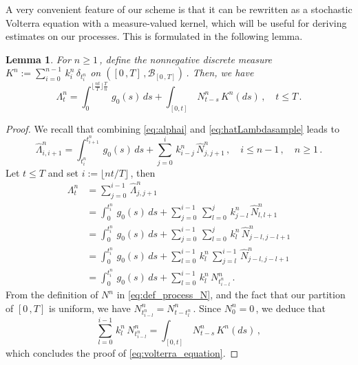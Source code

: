 \documentclass{article}
\newcommand{\1}{\mathbbm{1}}
\newtheorem{lemma}[theorem]{Lemma}
\numberwithin{equation}{section}
\begin{document}
A very convenient feature of our scheme is that it can be rewritten as a stochastic Volterra equation with a measure-valued kernel, which will be useful for deriving estimates on our processes. This is formulated in the following lemma.
\begin{lemma}
    \label{lemma:Volterra}
    For $n \geq 1\,$, define the nonnegative discrete measure $K^n := \sum_{i = 0}^{n-1}\, k^n_{i}\, \delta_{t^n_i}$ on $\left([0\,,T]\,, \mathcal B_{[0\,,T]}\right)\,$. Then, we have 
    \begin{equation}
    \label{eq:volterra_equation}
    \Lambda^n_t = \int_0^{\lfloor \frac{nt}{T}\rfloor \frac{T}{n}}\,g_0(s)\,ds + \int_{[0,t]}\, N^n_{t-s}\,K^n(ds)\,, \quad t \leq T\,.
    \end{equation}
\end{lemma}
\begin{proof}
We recall that combining \eqref{eq:alphai} and \eqref{eq:hatLambdasample} leads to 
$$
\widehat \Lambda^n_{i,i+1} = \int_{t^n_i}^{t^n_{i+1}}\,g_0(s)\,ds + \sum_{j = 0}^i\,k^n_{i-j}\,\widehat N^n_{j,j+1}\,, \quad i \leq n-1\,, \quad n \geq 1\,.
$$
    Let $t \leq T$ and set $i := \lfloor nt /T \rfloor\,$, then 
    \begin{align*}
        \Lambda^n_t &= \sum_{j = 0}^{i - 1}\, \widehat \Lambda^n_{j,j+1} \\
        &= \int_0^{t^n_i}\,g_0(s)\,ds + \sum_{j = 0}^{i-1}\, \sum_{l = 0}^{j}\,k^n_{j -l}\,\widehat N^n_{l,l+1} \\
        &= \int_0^{t^n_i}\,g_0(s)\,ds + \sum_{j = 0}^{i-1}\, \sum_{l = 0}^{j}\,k^n_l \,\widehat N^n_{j-l, j-l+1} \\
        &= \int_0^{t^n_i}\,g_0(s)\,ds + \sum_{l = 0}^{i-1}\,k^n_l\,\sum_{j = l}^{i-1}\, \widehat N^n_{j-l, j-l+1} \\
        &= \int_0^{t^n_i}\,g_0(s)\,ds + \sum_{l = 0}^{i-1}\,k^n_l \, N^n_{t^n_{i-l}} \,.
    \end{align*}
From the definition of $N^n$ in \eqref{eq:def_process_N}, and the fact that our partition of $[0\,,T]$ is uniform, we have $N^n_{t^n_{i-l}} = N^n_{t - t^n_l}\,$. Since $N^n_0 = 0\,$, we deduce that 
$$
\sum_{l = 0}^{i-1}\,k^n_{l}\, N^n_{t^n_{i-l}} = \int_{[0,t]}\,N^n_{t-s}\,K^n(ds)\,,
$$
which concludes the proof of \eqref{eq:volterra_equation}.
\end{proof}
\end{document}
